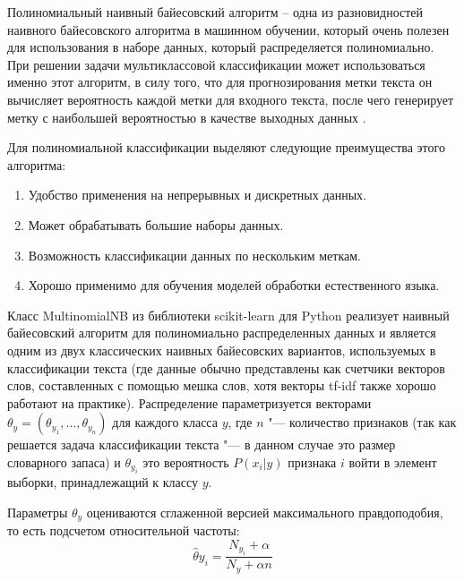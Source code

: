 \documentclass[bachelor, och, coursework]{SCWorks}
\begin{document}
            Полиномиальный наивный байесовский алгоритм – одна из разновидностей
            наивного байесовского алгоритма в машинном обучении, который очень
            полезен для использования в наборе данных, который распределяется
            полиномиально. При решении задачи мультиклассовой классификации
            может использоваться именно этот алгоритм, в силу того, что для
            прогнозирования метки текста он вычисляет вероятность каждой метки
            для входного текста, после чего генерирует метку с наибольшей
            вероятностью в качестве выходных данных \cite{nb}.

            Для полиномиальной классификации выделяют следующие преимущества
            этого алгоритма:

                \begin{enumerate}
                    \item Удобство применения на непрерывных и дискретных
                    данных.
                    \item Может обрабатывать большие наборы данных.
                    \item Возможность классификации данных по нескольким меткам.
                    \item Хорошо применимо для обучения моделей обработки
                    естественного языка.
                \end{enumerate}

            Класс MultinomialNB из библиотеки scikit-learn для Python реализует
            наивный байесовский алгоритм для полиномиально распределенных данных
            и является одним из двух классических наивных байесовских вариантов,
            используемых в классификации текста (где данные обычно представлены
            как счетчики векторов слов, составленных с помощью мешка слов, хотя
            векторы tf-idf также хорошо работают на практике). Распределение
            параметризуется векторами $\theta_y = (\theta_{y_1}, \dots,
            \theta_{y_n})$ для каждого класса $y$, где $n$ "--- количество
            признаков (так как решается задача классификации текста "--- в
            данном случае это размер словарного запаса) и $\theta_{y_i}$ это
            вероятность $P(x_i | y)$ признака $i$ войти в элемент выборки,
            принадлежащий к классу $y$.

            Параметры $\theta_y$ оцениваются сглаженной версией максимального
            правдоподобия, то есть подсчетом относительной частоты:
            $$\hat{\theta}{y_i} = \frac{N_{y_i} + \alpha}{N_y + \alpha n}$$
\end{document}
